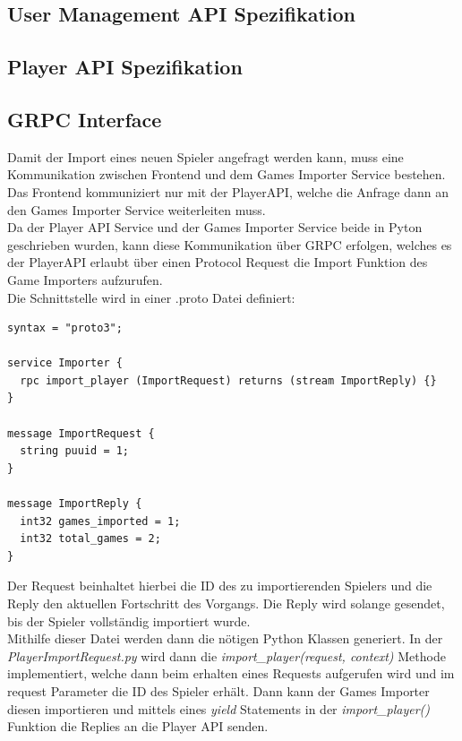 \subsection{User Management API Spezifikation}

\subsection{Player API Spezifikation}

\subsection{GRPC Interface}
Damit der Import eines neuen Spieler angefragt werden kann, muss eine Kommunikation zwischen Frontend und dem Games Importer Service bestehen. Das Frontend kommuniziert nur mit der PlayerAPI, welche die Anfrage dann an den Games Importer Service weiterleiten muss.\\
Da der Player API Service und der Games Importer Service beide in Pyton geschrieben wurden, kann diese Kommunikation über GRPC erfolgen, welches es der PlayerAPI erlaubt über einen Protocol Request die Import Funktion des Game Importers aufzurufen.\\ %
Die Schnittstelle wird in einer .proto Datei definiert:

\begin{lstlisting}
syntax = "proto3";

service Importer {
  rpc import_player (ImportRequest) returns (stream ImportReply) {}
}

message ImportRequest {
  string puuid = 1;
}

message ImportReply {
  int32 games_imported = 1;
  int32 total_games = 2;
}
\end{lstlisting}
Der Request beinhaltet hierbei die ID des zu importierenden Spielers und die Reply den aktuellen Fortschritt des Vorgangs. Die Reply wird solange gesendet, bis der Spieler vollständig importiert wurde.\\
Mithilfe dieser Datei werden dann die nötigen Python Klassen generiert. In der \textit{PlayerImportRequest.py} wird dann die \textit{import\_player(request, context)} Methode implementiert, welche dann beim erhalten eines Requests aufgerufen wird und im request Parameter die ID des Spieler erhält. Dann kann der Games Importer diesen importieren und mittels eines \textit{yield} Statements in der \textit{import\_player()} Funktion die Replies an die Player API senden.


